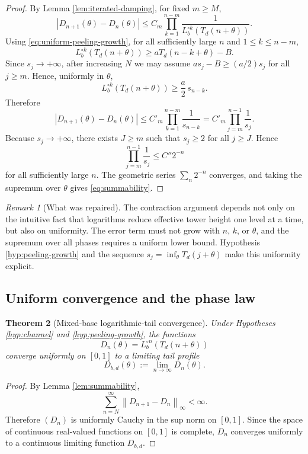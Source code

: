 \documentclass[11pt,a4paper]{article}
\theoremstyle{plain}
\newtheorem{theorem}{Theorem}[section]
\theoremstyle{definition}
\theoremstyle{remark}
\newtheorem{remark}[theorem]{Remark}
\newcommand{\norm}[1]{\left\lVert #1\right\rVert}
\newcommand{\abs}[1]{\left\lvert #1\right\rvert}
\begin{document}
\begin{proof}
By Lemma \ref{lem:iterated-damping}, for fixed $m\geq M$,
\[
  \abs{D_{n+1}(\theta)-D_n(\theta)}
  \leq C_m\prod_{k=1}^{n-m}\frac{1}{L_b^{\circ k}(T_d(n+\theta))}.
\]
Using \eqref{eq:uniform-peeling-growth}, for all sufficiently large $n$ and $1\leq k\leq n-m$,
\[
  L_b^{\circ k}(T_d(n+\theta))\geq aT_d(n-k+\theta)-B.
\]
Since $s_j\to+\infty$, after increasing $N$ we may assume $a s_j-B\geq (a/2)s_j$ for all $j\geq m$.  Hence, uniformly in $\theta$,
\[
  L_b^{\circ k}(T_d(n+\theta))\geq \frac a2\,s_{n-k}.
\]
Therefore
\[
  \abs{D_{n+1}(\theta)-D_n(\theta)}
  \leq C'_m\prod_{k=1}^{n-m}\frac{1}{s_{n-k}}
  =C'_m\prod_{j=m}^{n-1}\frac1{s_j}.
\]
Because $s_j\to+\infty$, there exists $J\geq m$ such that $s_j\geq2$ for all $j\geq J$.  Hence
\[
  \prod_{j=m}^{n-1}\frac1{s_j}\leq C''2^{-n}
\]
for all sufficiently large $n$.  The geometric series $\sum_n2^{-n}$ converges, and taking the supremum over $\theta$ gives \eqref{eq:summability}.
\end{proof}

\begin{remark}[What was repaired]
The contraction argument depends not only on the intuitive fact that logarithms reduce effective tower height one level at a time, but also on uniformity.  The error term must not grow with $n$, $k$, or $\theta$, and the supremum over all phases requires a uniform lower bound.  Hypothesis \ref{hyp:peeling-growth} and the sequence $s_j=\inf_\theta T_d(j+\theta)$ make this uniformity explicit.
\end{remark}

\subsection{Uniform convergence and the phase law}

\begin{theorem}[Mixed-base logarithmic-tail convergence]\label{thm:tail-convergence}
Under Hypotheses \ref{hyp:channel} and \ref{hyp:peeling-growth}, the functions
\[
  D_n(\theta)=L_b^{\circ n}(T_d(n+\theta))
\]
converge uniformly on $[0,1]$ to a limiting tail profile
\begin{equation}\label{eq:limit-tail}
  D_{b,d}(\theta):=\lim_{n\to\infty}D_n(\theta).
\end{equation}
\end{theorem}

\begin{proof}
By Lemma \ref{lem:summability},
\[
  \sum_{n=N}^{\infty}\norm{D_{n+1}-D_n}_\infty<\infty.
\]
Therefore $(D_n)$ is uniformly Cauchy in the sup norm on $[0,1]$.  Since the space of continuous real-valued functions on $[0,1]$ is complete, $D_n$ converges uniformly to a continuous limiting function $D_{b,d}$.
\end{proof}
\end{document}
